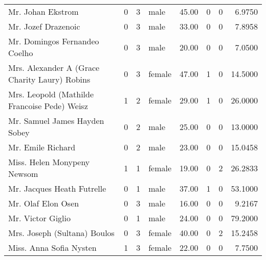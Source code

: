 \begin{tabular}{lrrlrrrr}
Mr. Johan Ekstrom                                  &         0 &       3 &    male &  45.00 &                        0 &                        0 &    6.9750 \\
Mr. Jozef Drazenoic                                &         0 &       3 &    male &  33.00 &                        0 &                        0 &    7.8958 \\
Mr. Domingos Fernandeo Coelho                      &         0 &       3 &    male &  20.00 &                        0 &                        0 &    7.0500 \\
Mrs. Alexander A (Grace Charity Laury) Robins      &         0 &       3 &  female &  47.00 &                        1 &                        0 &   14.5000 \\
Mrs. Leopold (Mathilde Francoise Pede) Weisz       &         1 &       2 &  female &  29.00 &                        1 &                        0 &   26.0000 \\
Mr. Samuel James Hayden Sobey                      &         0 &       2 &    male &  25.00 &                        0 &                        0 &   13.0000 \\
Mr. Emile Richard                                  &         0 &       2 &    male &  23.00 &                        0 &                        0 &   15.0458 \\
Miss. Helen Monypeny Newsom                        &         1 &       1 &  female &  19.00 &                        0 &                        2 &   26.2833 \\
Mr. Jacques Heath Futrelle                         &         0 &       1 &    male &  37.00 &                        1 &                        0 &   53.1000 \\
Mr. Olaf Elon Osen                                 &         0 &       3 &    male &  16.00 &                        0 &                        0 &    9.2167 \\
Mr. Victor Giglio                                  &         0 &       1 &    male &  24.00 &                        0 &                        0 &   79.2000 \\
Mrs. Joseph (Sultana) Boulos                       &         0 &       3 &  female &  40.00 &                        0 &                        2 &   15.2458 \\
Miss. Anna Sofia Nysten                            &         1 &       3 &  female &  22.00 &                        0 &                        0 &    7.7500 \\

\end{tabular}
